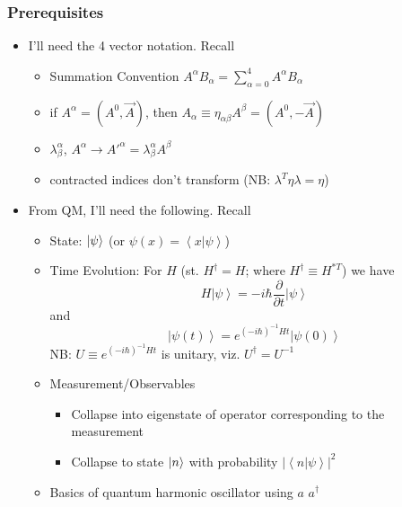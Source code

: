 \documentclass{beamer}
\begin{document}
\begin{frame}
	\frametitle{Prerequisites}
		\begin{itemize}
			\item I'll need the 4 vector notation. Recall
			\begin{itemize}
				\item Summation Convention $A^{\alpha}B_{\alpha}=\sum_{\alpha=0}^{4}A^{\alpha}B_{\alpha}$
				\pause
				\item if $A^{\alpha}=(A^{0},\vec{A})$, then $A_{\alpha}\equiv\eta_{\alpha\beta}A^{\beta}=(A^{0},-\vec{A})$
				\pause
				\item $\lambda_{\beta}^{\alpha}$, $A^{\alpha}\to A'^{\alpha}=\lambda_{\beta}^{\alpha}A^{\beta}$
				\pause
				\item contracted indices don't transform (NB: $\lambda^{T}\eta\lambda=\eta$)
				\pause
			\end{itemize}
			\item From QM, I'll need the following. Recall
			\begin{itemize}
				\item State: $\ket{\psi}$ (or $\psi(x)=\left\langle x|\psi\right\rangle$)
				\pause
				\item Time Evolution: For $H$ (st. $H^{\dagger}=H$; where $H^{\dagger}\equiv H^{*T}$) we have 
				\[H\left|\psi\right\rangle =-i\hbar\frac{\partial}{\partial t}\left|\psi\right\rangle\] 
				\pause
				and
				\[\left|\psi(t)\right\rangle =e^{(-i\hbar)^{-1}Ht}\left|\psi(0)\right\rangle \]
				NB: $U\equiv e^{(-i\hbar)^{-1}Ht}$ is unitary, viz. $U^{\dagger}=U^{-1}$
				\pause
				\item Measurement/Observables
				\begin{itemize}
					\item Collapse into eigenstate of operator corresponding to the measurement
					\pause
					\item Collapse to state $\ket{n}$ with probability $\left|\left\langle n|\psi\right\rangle \right|^{2}$
					\pause
				\end{itemize}
				\item Basics of quantum harmonic oscillator using $a$ $a^{\dagger}$
			\end{itemize}
		\end{itemize}
\end{frame}
\end{document}
